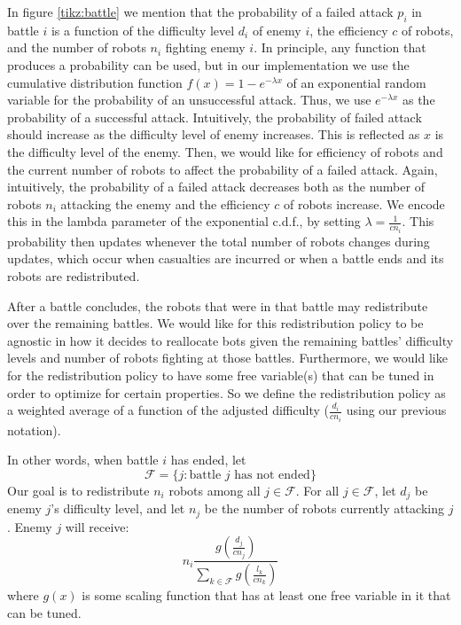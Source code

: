 \documentclass[11pt]{article}
\theoremstyle{definition}
\begin{document}
In figure \ref{tikz:battle} we mention that the probability of a failed attack
$p_i$ in battle $i$ is a function of the difficulty level $d_i$ of enemy $i$,
the efficiency $c$ of robots, and the number of robots $n_i$ fighting enemy
$i$.
%
In principle, any function that produces a probability can be used, but in our
implementation we use the cumulative distribution function
$f(x) = 1 - e^{-\lambda x}$ of an exponential random variable for the
probability of an unsuccessful attack.
%
Thus, we use $e^{-\lambda x}$ as the probability of a successful attack.
%
Intuitively, the probability of failed attack should increase as the difficulty
level of enemy increases.
This is reflected as $x$ is the difficulty level
of the enemy.
%
Then, we would like for efficiency of robots and the current number of robots
to affect the probability of a failed attack.
Again, intuitively, the probability of a failed attack decreases both as the
number of robots $n_i$ attacking the enemy and the efficiency $c$ of robots
increase.
%
We encode this in the lambda parameter of the exponential c.d.f., by setting
$\lambda = \frac{1}{c n_i}$.
This probability then updates whenever the total number of robots changes
during updates, which occur when casualties are incurred or when a battle ends
and its robots are redistributed.

After a battle concludes, the robots that were
in that battle may redistribute over the remaining battles.
We would like for this redistribution policy
to be agnostic in how it decides to reallocate
bots given the remaining battles' difficulty
levels and number of robots fighting at those battles.
Furthermore, we would like for the redistribution
policy to have some free variable(s) that can be
tuned in order to optimize for certain properties.
%
So we define the redistribution policy as a weighted
average of a function of the adjusted difficulty
($\frac{d_i}{c n_i}$ using our previous notation).

In other words, when battle $ i $ has ended,
let
\begin{equation*}
    \mathcal{F} = \{
        j : \text{battle } j \text{ has not ended}
    \}
\end{equation*}
%
Our goal is to redistribute $ n_i $ robots among
all $ j \in \mathcal{F} $.
%
For all $ j \in \mathcal{F} $, let $ d_j $ be enemy
$j$'s difficulty level, and let $ n_j $ be the number
of robots currently attacking $j$.
Enemy $j$ will receive:
\begin{equation*}
    n_i \frac{g(\frac{d_j}{c n_j})}{
        {\displaystyle\sum_{k \in \mathcal{F}}}
        g(\frac{l_k}{c n_k})}
\end{equation*}
%
where $g(x)$ is some scaling function that has at least one free variable in
it that can be tuned.
\end{document}
